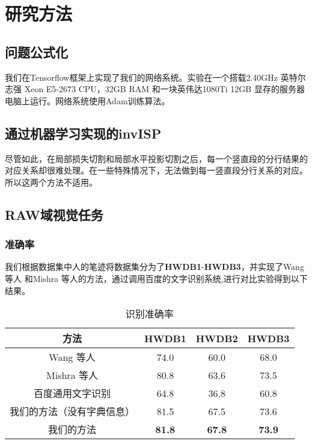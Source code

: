\documentclass[winfonts]{njuthesis}
\begin{document}



\chapter{研究方法}

\section{问题公式化}
我们在Tensorflow框架上实现了我们的网络系统。实验在一个搭载2.40GHz 英特尔志强 Xeon E5-2673 CPU，32GB RAM 和一块英伟达1080Ti 12GB 显存的服务器电脑上运行。网络系统使用Adam训练算法。



\section{通过机器学习实现的invISP}
尽管如此，在局部损失切割和局部水平投影切割之后，每一个竖直段的分行结果的对应关系却很难处理。在一些特殊情况下，无法做到每一竖直段分行关系的对应。所以这两个方法不适用。




\section{RAW域视觉任务}

\subsection{准确率}
我们根据数据集中人的笔迹将数据集分为了\textbf{HWDB1}-\textbf{HWDB3}，并实现了Wang 等人\cite{wang2012end} 和Mishra 等人\cite{mishra2012scene}的方法，通过调用百度的文字识别系统\cite{baiduapi},进行对比实验得到以下结果。

\vspace{0.2cm}
\begin{table}[htbp]
\setlength{\belowcaptionskip}{5pt}
  \centering
  \begin{tabular}{cccc}
    \toprule
    \textbf{方法} & \textbf{HWDB1} & \textbf{HWDB2} & \textbf{HWDB3} \\
    \midrule
    Wang 等人\cite{wang2012end}   			& 74.0 & 60.0 & 68.0  \\
    Mishra 等人\cite{mishra2012scene}		 	& 80.8 & 63.6 & 73.5  \\
    百度通用文字识别\cite{baiduapi}		& 64.8 & 36.8 & 60.8 \\
    \midrule
    我们的方法（没有字典信息）& 81.5 & 67.5 & 73.6  \\
    我们的方法	  		& \textbf{81.8} & \textbf{67.8} & \textbf{73.9}  \\
    \bottomrule
  \end{tabular}
  \vspace{0.2cm}
  \caption{识别准确率}\label{table:result}
\end{table}
\end{document}
